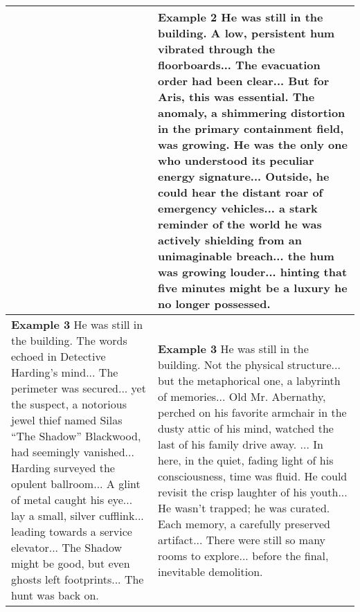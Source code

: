\begin{table*}[h!]
{\begin{tabular}{p{}  p{}}
&
\textbf{Example 2} \newline
He was still in the building. A low, persistent hum vibrated through the floorboards... The evacuation order had been clear... But for Aris, this was essential. The anomaly, a shimmering distortion in the primary containment field, was growing. He was the only one who understood its peculiar energy signature... Outside, he could hear the distant roar of emergency vehicles... a stark reminder of the world he was actively shielding from an unimaginable breach... the hum was growing louder... hinting that five minutes might be a luxury he no longer possessed. \\
\midrule
\textbf{Example 3} \newline
He was still in the building. The words echoed in Detective Harding's mind... The perimeter was secured... yet the suspect, a notorious jewel thief named Silas “The Shadow” Blackwood, had seemingly vanished... Harding surveyed the opulent ballroom... A glint of metal caught his eye... lay a small, silver cufflink... leading towards a service elevator... The Shadow might be good, but even ghosts left footprints... The hunt was back on.
&
\textbf{Example 3} \newline
He was still in the building. Not the physical structure... but the metaphorical one, a labyrinth of memories... Old Mr. Abernathy, perched on his favorite armchair in the dusty attic of his mind, watched the last of his family drive away. ... In here, in the quiet, fading light of his consciousness, time was fluid. He could revisit the crisp laughter of his youth... He wasn't trapped; he was curated. Each memory, a carefully preserved artifact... There were still so many rooms to explore... before the final, inevitable demolition. \\
\bottomrule
\end{tabular}
}
\end{table*}



